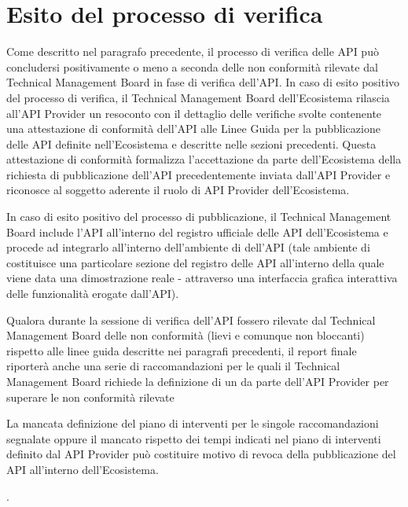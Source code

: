 \documentclass[letterpaper,10pt,italian]{sphinxmanual}
\begin{document}
\section{Esito del processo di verifica}
\label{\detokenize{verificheTMB:sezione32}}\label{\detokenize{verificheTMB:esito-del-processo-di-verifica}}
Come descritto nel paragrafo precedente, il processo di verifica delle API può concludersi positivamente o meno a seconda delle non conformità rilevate dal Technical Management Board in fase di verifica dell’API.
In caso di esito positivo del processo di verifica, il Technical Management Board dell’Ecosistema rilascia all’API Provider un resoconto con il dettaglio delle verifiche svolte contenente una attestazione di conformità dell’API alle Linee Guida per la pubblicazione delle API definite nell’Ecosistema e descritte nelle sezioni precedenti. Questa attestazione di conformità formalizza l’accettazione da parte dell’Ecosistema della richiesta di pubblicazione dell’API precedentemente inviata dall’API Provider e riconosce al soggetto aderente il ruolo di API Provider dell’Ecosistema.

In caso di esito positivo del processo di pubblicazione, il Technical Management Board include l’API all’interno del registro ufficiale delle API dell’Ecosistema e procede ad integrarlo all’interno dell’ambiente di  dell’API (tale ambiente di  costituisce una particolare sezione del registro delle API all’interno della quale viene data una dimostrazione reale - attraverso una interfaccia grafica interattiva \textendash{} delle funzionalità erogate dall’API).

Qualora durante la sessione di verifica dell’API fossero rilevate dal Technical Management Board delle non conformità (lievi e comunque non bloccanti) rispetto alle linee guida descritte nei paragrafi precedenti, il report finale riporterà anche una serie di raccomandazioni per le quali il Technical Management Board richiede la definizione di un  da parte dell’API Provider per superare le non conformità rilevate %
\begin{footnote}[2]\sphinxAtStartFootnote
La mancata definizione del piano di interventi per le singole raccomandazioni segnalate oppure il mancato rispetto dei tempi indicati nel piano di interventi definito dal API Provider può costituire motivo di revoca della pubblicazione del API all’interno dell’Ecosistema.
%
\end{footnote}.



\renewcommand{\indexname}{Indice}
\printindex
\end{document}
